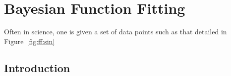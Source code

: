 \chapter{Bayesian Function Fitting}
\label{chap:ff}

% 

Often in science, one is given a set of data points such as that detailed in Figure~\ref{fig:ff:sin}

\section{Introduction}
\label{sec:ff:intro}
